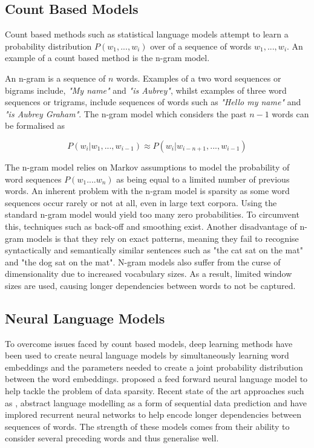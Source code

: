 \subsection{Count Based Models}
Count based methods such as statistical language models attempt to learn a probability distribution \(P(w_{1},...,w_{i}) \) over of a sequence of words \(w_{1},...,w_{i}\). An example of a count based method is the n-gram model.

\noindent
\newline
An n-gram is a sequence of \(n\) words. Examples of a two word sequences or bigrams include, \textit{"My name"} and \textit{"is Aubrey"}, whilst examples of three word sequences or trigrams, include sequences of words such as \textit{"Hello my name"} and \textit{"is Aubrey Graham"}. The n-gram model which considers the past \(n-1\) words can be formalised as 

\begin{equation}
	P(w_{i} | w_{1},...,w_{i-1}) \approx P(w_{i} | w_{i-n+1},...,w_{i-1})
\end{equation}

\noindent
\newline
The n-gram model relies on Markov assumptions to model the probability of word sequences \(P(w_{1}....w_{n}) \) as being equal to a limited number of previous words. An inherent problem with the n-gram model is sparsity as some word sequences occur rarely or not at all, even in large text corpora. Using the standard n-gram model would yield too many zero probabilities. To circumvent this, techniques such as back-off and smoothing exist. Another disadvantage of n-gram models is that they rely on exact patterns, meaning they fail to recognise syntactically and semantically similar sentences such as "the cat sat on the mat" and "the dog sat on the mat". N-gram models also suffer from the curse of dimensionality due to increased vocabulary sizes. As a result, limited window sizes are used, causing longer dependencies between words to not be captured.

\subsection{Neural Language Models}
To overcome issues faced by count based models, deep learning methods have been used to create neural language models by simultaneously learning word embeddings and the parameters needed to create a joint probability distribution between the word embeddings. \cite{Bengio2003} proposed a feed forward neural language model to help tackle the problem of data sparsity. Recent state of the art approaches such as \cite{Mikolov2010}, abstract language modelling as a form of sequential data prediction and have implored recurrent neural networks to help encode longer dependencies between sequences of words. The strength of these models comes from their ability to consider several preceding words and thus generalise well.

